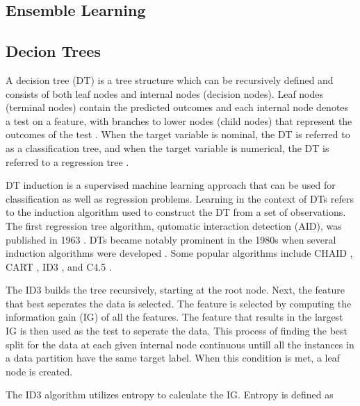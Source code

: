 \documentclass[conference]{IEEEtran}
\begin{document}
    \subsection{Ensemble Learning}


    \subsection{Decion Trees}

        A decision tree (DT) is a tree structure which can be recursively defined and consists of both leaf nodes
        and internal nodes (decision nodes). Leaf nodes (terminal nodes) contain the predicted outcomes and each internal
        node denotes a test on a feature, with branches to lower nodes (child nodes) that represent the outcomes of the
        test \cite{DT_Rokach2010, GavinPotgieter}. When the target variable is nominal, the DT is referred to as a classification
        tree, and when the target variable is numerical, the DT is referred to a regression tree \cite{DT_Kotsiantis2013, DT_Blockeel2023}.

        DT induction is a supervised machine learning approach that can be used for classification as well as regression problems.
        Learning in the context of DTs refers to the induction algorithm used to construct the DT from a set of observations.
        The first regression tree algorithm, qutomatic interaction detection (AID), was published in 1963 \cite{DT_Morgan1963ProblemsIT}.
        DTs became notably prominent in the 1980s when several induction algorithms were developed \cite{DT_Kotsiantis2013}. Some popular
        algorithms include  CHAID \cite{DT_Kass1980}, CART \cite{DT_breiman1984classification}, ID3 \cite{DT_quinlan1986}, and C4.5 \cite{DT_quinlan1993}.
        
        The ID3 \cite{DT_quinlan1986} builds the tree recursively, starting at the root node. Next, the feature that best
        seperates the data is selected. The feature is selected by computing the information gain (IG) of all the features.
        The feature that results in the largest IG is then used as the test to seperate the data.
        This process of finding the best split for the data at each given internal node continuous untill all the instances
        in a data partition have the same target label. When this condition is met, a leaf node is created.

        The ID3 algorithm utilizes entropy to calculate the IG. Entropy is defined as
\end{document}
